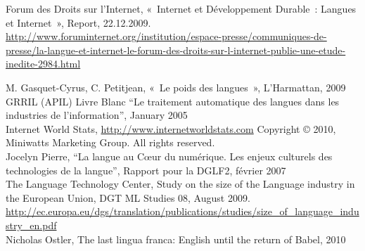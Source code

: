 \begin{sloppypar}
Forum des Droits sur l’Internet, «~Internet et Développement Durable~: Langues et Internet~», Report, 22.12.2009.\\
\url{http://www.foruminternet.org/institution/espace-presse/communiques-de-presse/la-langue-et-internet-le-forum-des-droits-sur-l-internet-publie-une-etude-inedite-2984.html}\\
\end{sloppypar}


M. Gasquet-Cyrus, C. Petitjean, «~Le poids des langues~», L’Harmattan, 2009\\

GRRIL (APIL) Livre Blanc ``Le traitement automatique des langues dans les industries de l’information'', January 2005\\

Internet World Stats, \url{http://www.internetworldstats.com} Copyright © 2010, Miniwatts Marketing Group. All rights reserved.\\

Jocelyn Pierre, ``La langue au Cœur du numérique. Les enjeux culturels des technologies de la langue'', Rapport pour la DGLF2, février 2007\\

The Language Technology Center, Study on the size of the Language industry in the European Union, DGT ML Studies 08, August 2009. \url{http://ec.europa.eu/dgs/translation/publications/studies/size\_of\_language\_industry\_en.pdf}\\

Nicholas Ostler, The last lingua franca: English until the return of Babel, 2010\\



%

  
\cleardoublepage

\label{metanetmembers}

